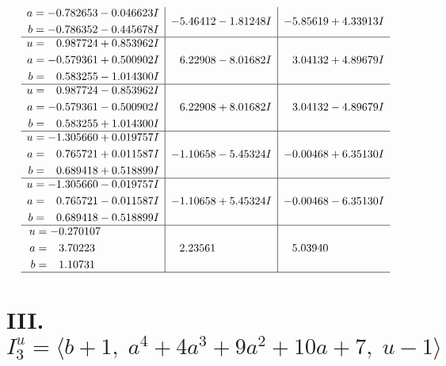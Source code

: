 \documentclass[1p]{elsarticle_modified}
\theoremstyle{definition}
\begin{document}
$$\begin{array}{c|c|c}
\begin{aligned}
a &= -0.782653 - 0.046623 I \\
b &= -0.786352 - 0.445678 I\end{aligned}
 & -5.46412 - 1.81248 I & -5.85619 + 4.33913 I \\ \hline\begin{aligned}
u &= \phantom{-}0.987724 + 0.853962 I \\
a &= -0.579361 + 0.500902 I \\
b &= \phantom{-}0.583255 - 1.014300 I\end{aligned}
 & \phantom{-}6.22908 - 8.01682 I & \phantom{-}3.04132 + 4.89679 I \\ \hline\begin{aligned}
u &= \phantom{-}0.987724 - 0.853962 I \\
a &= -0.579361 - 0.500902 I \\
b &= \phantom{-}0.583255 + 1.014300 I\end{aligned}
 & \phantom{-}6.22908 + 8.01682 I & \phantom{-}3.04132 - 4.89679 I \\ \hline\begin{aligned}
u &= -1.305660 + 0.019757 I \\
a &= \phantom{-}0.765721 + 0.011587 I \\
b &= \phantom{-}0.689418 + 0.518899 I\end{aligned}
 & -1.10658 - 5.45324 I & -0.00468 + 6.35130 I \\ \hline\begin{aligned}
u &= -1.305660 - 0.019757 I \\
a &= \phantom{-}0.765721 - 0.011587 I \\
b &= \phantom{-}0.689418 - 0.518899 I\end{aligned}
 & -1.10658 + 5.45324 I & -0.00468 - 6.35130 I \\ \hline\begin{aligned}
u &= -0.270107\phantom{ +0.000000I} \\
a &= \phantom{-}3.70223\phantom{ +0.000000I} \\
b &= \phantom{-}1.10731\phantom{ +0.000000I}\end{aligned}
 & \phantom{-}2.23561\phantom{ +0.000000I} & \phantom{-}5.03940\phantom{ +0.000000I}\\
 \hline 
 \end{array}$$\newpage\newpage\renewcommand{\arraystretch}{1}
\centering \section*{III. $I^u_{3}= \langle b+1,\;a^4+4 a^3+9 a^2+10 a+7,\;u-1 \rangle$}
\end{document}
